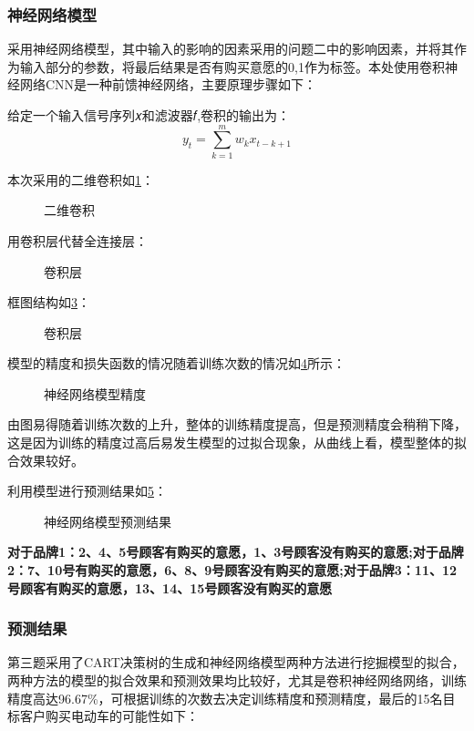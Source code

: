 \documentclass{JXUSTmodeling}
\begin{document}
\subsubsection{神经网络模型}
采用神经网络模型，其中输入的影响的因素采用的问题二中的影响因素，并将其作为输入部分的参数，将最后结果是否有购买意愿的0,1作为标签。本处使用卷积神经网络CNN是一种前馈神经网络，主要原理步骤如下：

给定一个输入信号序列𝑥和滤波器𝑓,卷积的输出为：
\begin{equation}
y_{t}=\sum_{k=1}^{m}w_{k}x_{t-k+1}
\end{equation}

本次采用的二维卷积如\ref{fig:15}：
\begin{figure}[!htbp]
	\centering
	\caption{二维卷积}
	\label{fig:15}
\end{figure}

用卷积层代替全连接层：
\begin{figure}[!htbp]
	\centering
	\caption{卷积层}
	\label{fig:16}
\end{figure}

框图结构如\ref{fig:17}：
\begin{figure}[!htbp]
	\centering
	\caption{卷积层}
	\label{fig:17}
\end{figure}

模型的精度和损失函数的情况随着训练次数的情况如\ref{fig:18}所示：

\begin{figure}[!htbp]
	\centering
	\caption{神经网络模型精度}
	\label{fig:18}
\end{figure}

由图易得随着训练次数的上升，整体的训练精度提高，但是预测精度会稍稍下降，这是因为训练的精度过高后易发生模型的过拟合现象，从曲线上看，模型整体的拟合效果较好。

利用模型进行预测结果如\ref{fig:19}：
\begin{figure}[!htbp]
	\centering
	\caption{神经网络模型预测结果}
	\label{fig:19}
\end{figure}

\textbf{对于品牌1：2、4、5号顾客有购买的意愿，1、3号顾客没有购买的意愿;对于品牌2：7、10号有购买的意愿，6、8、9号顾客没有购买的意愿;对于品牌3：11、12号顾客有购买的意愿，13、14、15号顾客没有购买的意愿}
\subsubsection{预测结果}
第三题采用了CART决策树的生成和神经网络模型两种方法进行挖掘模型的拟合，两种方法的模型的拟合效果和预测效果均比较好，尤其是卷积神经网络网络，训练精度高达96.67\%，可根据训练的次数去决定训练精度和预测精度，最后的15名目标客户购买电动车的可能性如下：
\end{document}
